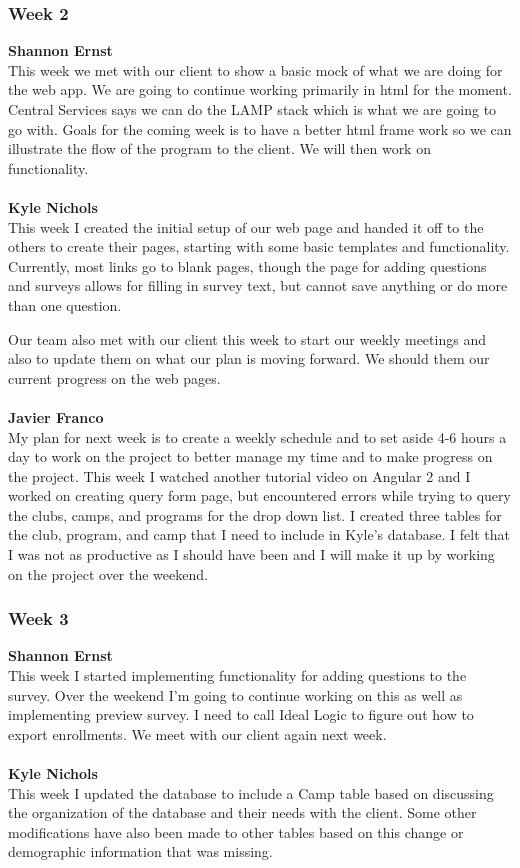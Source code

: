 \documentclass[../final.tex]{subfiles}
\begin{document}
\subsubsection{Week 2}
\textbf{Shannon Ernst}\\
This week we met with our client to show a basic mock of what we are doing for the web app. We are going to continue working primarily in html for the moment. Central Services says we can do the LAMP stack which is what we are going to go with. Goals for the coming week is to have a better html frame work so we can illustrate the flow of the program to the client. We will then work on functionality. \\ \\
\textbf{Kyle Nichols}\\ 
This week I created the initial setup of our web page and handed it off to the others to create their pages, starting with some basic templates and functionality. Currently, most links go to blank pages, though the page for adding questions and surveys allows for filling in survey text, but cannot save anything or do more than one question.

Our team also met with our client this week to start our weekly meetings and also to update them on what our plan is moving forward. We should them our current progress on the web pages.\\ \\
\textbf{Javier Franco}\\
My plan for next week is to create a weekly schedule and to set aside 4-6 hours a day to work on the project to better manage my time and to make progress on the project. This week I watched another tutorial video on Angular 2 and I worked on creating query form page, but encountered errors while trying to query the clubs, camps, and programs for the drop down list. I created three tables for the club, program, and camp that I need to include in Kyle's database. I felt that I was not as productive as I should have been and I will make it up by working on the project over the weekend. \\
\subsubsection{Week 3}
\textbf{Shannon Ernst}\\
This week I started implementing functionality for adding questions to the survey. Over the weekend I'm going to continue working on this as well as implementing preview survey. I need to call Ideal Logic to figure out how to export enrollments. We meet with our client again next week. \\ \\
\textbf{Kyle Nichols}\\
This week I updated the database to include a Camp table based on discussing the organization of the database and their needs with the client. Some other modifications have also been made to other tables based on this change or demographic information that was missing.
\end{document}
